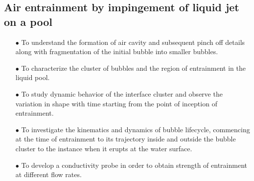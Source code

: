 \subsection{Air entrainment by impingement of liquid jet on a pool}
\begin{enumerate}
\item [$\bullet$] To understand the formation of air cavity and subsequent pinch off details along with fragmentation of the initial bubble into smaller bubbles.
\item [$\bullet$] To characterize the cluster of bubbles and the region of entrainment in the liquid pool. 
\item [$\bullet$] To study dynamic behavior of the interface cluster and observe the variation in shape with time starting from the point of inception of entrainment.
\item [$\bullet$] To investigate the kinematics and dynamics of bubble lifecycle, commencing at the time of entrainment to its trajectory inside and outside the bubble cluster to the instance when it erupts at the water surface.
\item [$\bullet$] To develop a conductivity probe in order to obtain strength of entrainment at different flow rates.
\end{enumerate}
